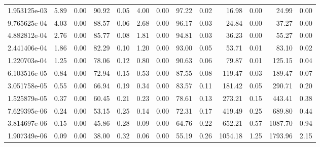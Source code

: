 \begin{tabular}{lrrrrrrrrrrrr}
1.953125e-03 &        5.89 &        0.00 &         90.92 &          0.05 &           4.00 &           0.00 &        97.22 &         0.02 &            16.98 &             0.00 &           24.99 &            0.00 \\
9.765625e-04 &        4.03 &        0.00 &         88.57 &          0.06 &           2.68 &           0.00 &        96.17 &         0.03 &            24.84 &             0.00 &           37.27 &            0.00 \\
4.882812e-04 &        2.76 &        0.00 &         85.77 &          0.08 &           1.81 &           0.00 &        94.81 &         0.03 &            36.23 &             0.00 &           55.27 &            0.00 \\
2.441406e-04 &        1.86 &        0.00 &         82.29 &          0.10 &           1.20 &           0.00 &        93.00 &         0.05 &            53.71 &             0.01 &           83.10 &            0.02 \\
1.220703e-04 &        1.25 &        0.00 &         78.06 &          0.12 &           0.80 &           0.00 &        90.63 &         0.06 &            79.87 &             0.01 &          125.15 &            0.04 \\
6.103516e-05 &        0.84 &        0.00 &         72.94 &          0.15 &           0.53 &           0.00 &        87.55 &         0.08 &           119.47 &             0.03 &          189.47 &            0.07 \\
3.051758e-05 &        0.55 &        0.00 &         66.94 &          0.19 &           0.34 &           0.00 &        83.57 &         0.11 &           181.42 &             0.05 &          290.71 &            0.20 \\
1.525879e-05 &        0.37 &        0.00 &         60.45 &          0.21 &           0.23 &           0.00 &        78.61 &         0.13 &           273.21 &             0.15 &          443.41 &            0.38 \\
7.629395e-06 &        0.24 &        0.00 &         53.15 &          0.25 &           0.14 &           0.00 &        72.31 &         0.17 &           419.49 &             0.25 &          689.80 &            0.44 \\
3.814697e-06 &        0.15 &        0.00 &         45.86 &          0.28 &           0.09 &           0.00 &        64.76 &         0.22 &           652.21 &             0.57 &         1087.70 &            0.94 \\
1.907349e-06 &        0.09 &        0.00 &         38.00 &          0.32 &           0.06 &           0.00 &        55.19 &         0.26 &          1054.18 &             1.25 &         1793.96 &            2.15 \\

\end{tabular}
